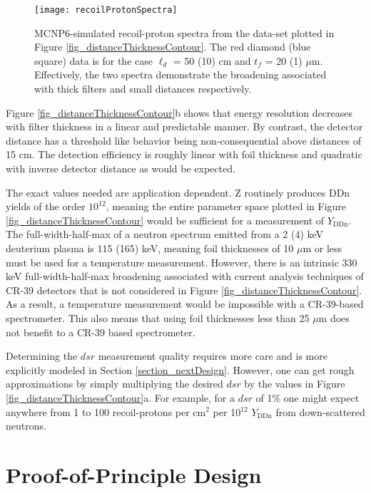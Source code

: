 \begin{figure}[h!]
	
	\centering
	\texttt{[image: recoilProtonSpectra]}
	\caption{MCNP6-simulated recoil-proton spectra from the data-set plotted in Figure \ref{fig_distanceThicknessContour}. The red diamond (blue square) data is for the case $\ell_d$ = 50 (10) cm and $t_f$ = 20 (1) $\mu$m. Effectively, the two spectra demonstrate the broadening associated with thick filters and small distances respectively.}
	\label{fig_recoilProtonSpectra}
	
\end{figure}

Figure \ref{fig_distanceThicknessContour}b shows that energy resolution decreases with filter thickness in a linear and predictable manner. By contrast, the detector distance has a threshold like behavior being non-consequential above distances of 15 cm. The detection efficiency is roughly linear with foil thickness and quadratic with inverse detector distance as would be expected. 

The exact values needed are application dependent. Z routinely produces DDn yields of the order $10^{12}$, meaning the entire parameter space plotted in Figure \ref{fig_distanceThicknessContour} would be sufficient for a measurement of $Y_{\mathrm{DDn}}$. The full-width-half-max of a neutron spectrum emitted from a 2 (4) keV deuterium plasma is 115 (165) keV, meaning foil thicknesses of 10 $\mu$m or less must be used for a temperature measurement. However, there is an intrinsic 330 keV full-width-half-max broadening associated with current analysis techniques of CR-39 detectors that is not considered in Figure \ref{fig_distanceThicknessContour}. \cite{SRF_RSI} As a result, a temperature measurement would be impossible with a CR-39-based spectrometer. This also means that using foil thicknesses less than 25 $\mu$m does not benefit to a CR-39 based spectrometer. 

Determining the $dsr$ measurement quality requires more care and is more explicitly modeled in Section \ref{section_nextDesign}. However, one can get rough approximations by simply multiplying the desired $dsr$ by the values in Figure \ref{fig_distanceThicknessContour}a. For example, for a $dsr$ of 1\% one might expect anywhere from 1 to 100 recoil-protons per cm$^2$ per 10$^{12}$ $Y_{\mathrm{DDn}}$ from down-scattered neutrons.

\section{Proof-of-Principle Design}
\label{section_proofDesigns}


